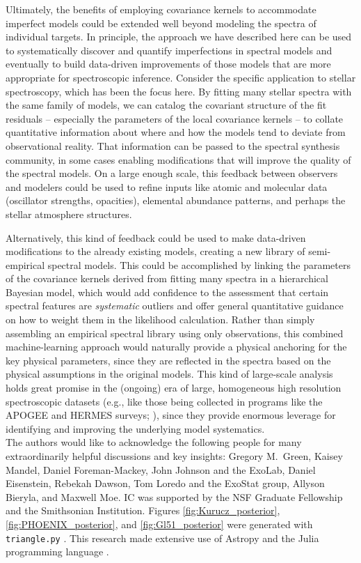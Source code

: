 \documentclass[iop,floatfix,numberedappendix,twocolappendix]{emulateapj}
\begin{document}
Ultimately, the benefits of employing covariance kernels to accommodate imperfect models could 
be extended well beyond modeling the spectra of individual targets.  In principle, the approach we 
have described here can be used to systematically discover and quantify imperfections in spectral 
models and eventually to build data-driven improvements of those models that are more appropriate 
for spectroscopic inference.  Consider the specific application to stellar spectroscopy, which has 
been the focus here.  By fitting many stellar spectra with the same family of models, we can 
catalog the covariant structure of the fit residuals -- especially the parameters of the local 
covariance kernels -- to collate quantitative information about where and how the models tend to 
deviate from observational reality.  That information can be passed to the spectral synthesis 
community, in some cases enabling modifications that will improve the quality of the spectral 
models.  On a large enough scale, this feedback between observers and modelers could be used to 
refine inputs like atomic and molecular data (oscillator strengths, opacities), elemental abundance 
patterns, and perhaps the stellar atmosphere structures.

Alternatively, this kind of feedback could be used to make data-driven modifications to the already 
existing models, creating a new library of semi-empirical spectral models.  This could be 
accomplished by linking the parameters of the covariance kernels derived from fitting many spectra 
in a hierarchical Bayesian model, which would add confidence to the assessment that certain 
spectral features are {\it systematic} outliers and offer general quantitative guidance on how to 
weight them in the likelihood calculation.  Rather than simply assembling an empirical spectral 
library using only observations, this combined machine-learning approach would naturally provide a 
physical anchoring for the key physical parameters, since they are reflected in the spectra based 
on the physical assumptions in the original models.  This kind of large-scale analysis holds great 
promise in the (ongoing) era of large, homogeneous high resolution spectroscopic datasets (e.g., 
like those being collected in programs like the APOGEE and HERMES surveys; \citealt{nidever12,
zucker12}), since they provide enormous leverage for identifying and improving the underlying model 
systematics. \\

\acknowledgments  The authors would like to acknowledge the following people for many 
extraordinarily helpful discussions and key insights: Gregory M.~Green, Kaisey Mandel, Daniel 
Foreman-Mackey, John Johnson and the ExoLab, Daniel Eisenstein, Rebekah Dawson, Tom Loredo and the 
ExoStat group, Allyson Bieryla, and Maxwell Moe.  IC was supported by the NSF Graduate Fellowship 
and the Smithsonian Institution.  Figures \ref{fig:Kurucz_posterior}, \ref{fig:PHOENIX_posterior}, 
and \ref{fig:Gl51_posterior} were generated with \texttt{triangle.py} \citep{foreman-mackey14}.  
This research made extensive use of Astropy \citep{astropy13} and the Julia programming language 
\citep{julia12}.
\end{document}
